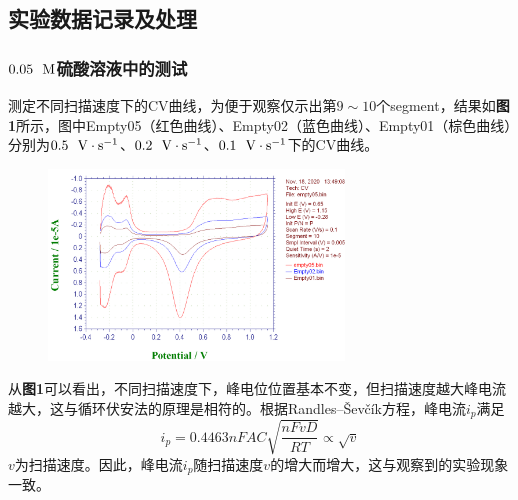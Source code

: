 \documentclass[12pt]{article}
\begin{document}
 \subsection{实验数据记录及处理}
 \subsubsection{$0.05\ \ {\rm M}$硫酸溶液中的测试}
 测定不同扫描速度下的CV曲线，为便于观察仅示出第$9\sim 10$个segment，结果如\textbf{图1}所示，图中Empty05（红色曲线）、Empty02（蓝色曲线）、Empty01（棕色曲线）分别为$0.5\ \ {\rm V\cdot s^{-1}}$、$0.2\ \ {\rm V\cdot s^{-1}}$、$0.1\ \ {\rm V\cdot s^{-1}}$下的CV曲线。
 \begin{figure}[h]
 	\centering
 	\includegraphics[width=0.7\textwidth]{1.bmp}
 \end{figure}
 \par
 从\textbf{图1}可以看出，不同扫描速度下，峰电位位置基本不变，但扫描速度越大峰电流越大，这与循环伏安法的原理是相符的。根据Randles–Ševčík方程，峰电流$i_{p}$满足
 $$
 i_{p}=0.4463 n F A C\sqrt{\frac{nFvD}{RT}}\propto\sqrt{v}
 $$
$v$为扫描速度。因此，峰电流$i_{p}$随扫描速度$v$的增大而增大，这与观察到的实验现象一致。
\end{document}
